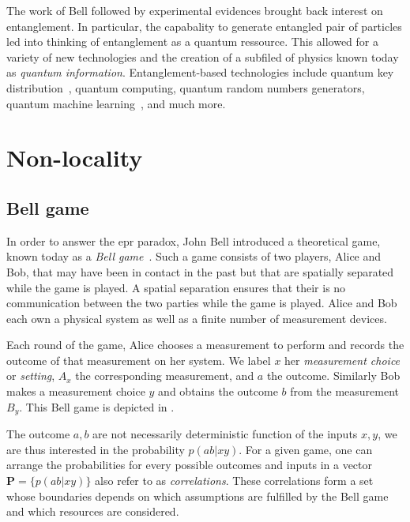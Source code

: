 \medbreak
The work of Bell followed by experimental evidences brought back interest on entanglement.
In particular, the capabality to generate entangled pair of particles led into thinking of entanglement as a quantum ressource.
This allowed for a variety of new technologies and the creation of a subfiled of physics known today as \textit{quantum information}.
Entanglement-based technologies include quantum key distribution~\cite{Ekert1991}, quantum computing, quantum random numbers generators, quantum machine learning~\cite{Biamonte2017}, and much more. 


\chapter{Non-locality}
\label{section:nonlocality}


\section{Bell game}

In order to answer the \acrshort{epr} paradox, John Bell introduced a theoretical game, known today as a \textit{Bell game}~\cite{Bell1964}.
Such a game consists of two players, Alice and Bob, that may have been in contact in the past but that are spatially separated while the game is played.
A spatial separation ensures that their is no communication between the two parties while the game is played.
Alice and Bob each own a physical system as well as a finite number of measurement devices.

Each round of the game, Alice chooses a measurement to perform and records the outcome of that measurement on her system.
We label $x$ her \textit{measurement choice} or \textit{setting}, $A_x$ the corresponding measurement, and $a$ the outcome.
Similarly Bob makes a measurement choice $y$ and obtains the outcome $b$ from the measurement $B_y$.
This Bell game is depicted in .

The outcome $a,b$ are not necessarily deterministic function of the inputs $x,y$, we are thus interested in the  probability $p(ab|xy)$. 
For a given game, one can arrange the probabilities for every possible outcomes and inputs in a vector $\mathbf{P}=\{ p(ab|xy)\}$ also refer to as \textit{correlations}.
These correlations form a set whose boundaries depends on which assumptions are fulfilled by the Bell game and which resources are considered.

